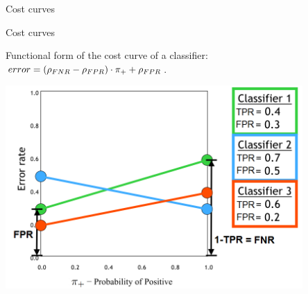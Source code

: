 \begin{vbframe}{Cost curves}

\end{vbframe}


\begin{vbframe}{Cost curves}


Functional form of the cost curve of a classifier: 
$error = (\rho_{FNR} - \rho_{FPR}) \cdot \pi_{+} + \rho_{FPR}$.

\begin{center}
  \includegraphics[width=0.85\textwidth]{figure_man/cost-curves-3.png}
\end{center}

\end{vbframe}


